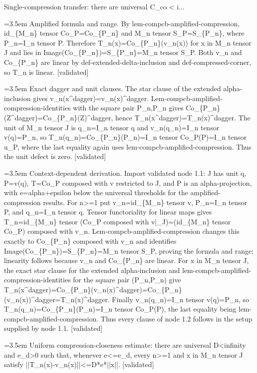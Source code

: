 \documentclass{article}
\newcommand{\step}[1]{\par\noindent\hangindent=3.5em\hangafter=1%
  \makebox[3.5em][l]{\textbf{#1.}}}
\newcommand{\steptag}[1]{\hfill{\small\textsf{[#1]}}}
\begin{document}
\begin{proofbox}{Single-compression transfer: there are universal C\_co < i...}
\step{1.2.1} Amplified formula and range. By lem-compcb-amplified-compression, id\_\{M\_n\} tensor Co\_P=Co\_\{P\_n\} and M\_n tensor S\_P=S\_\{P\_n\}, where P\_n=I\_n tensor P. Therefore T\_n(x)=Co\_\{P\_n\}(v\_n(x)) for x in M\_n tensor J and lies in Image(Co\_\{P\_n\})=S\_\{P\_n\}=M\_n tensor S\_P. Both v\_n and Co\_\{P\_n\} are linear by def-extended-delta-inclusion and def-compressed-corner, so T\_n is linear. \steptag{validated} \\[4pt]
\step{1.2.2} Exact dagger and unit clauses. The star clause of the extended alpha-inclusion gives v\_n(x\textasciicircum{}dagger)=v\_n(x)\textasciicircum{}dagger. Lem-compcb-amplified-compression-identities with the square pair P\_n,P\_n gives Co\_\{P\_n\}(Z\textasciicircum{}dagger)=Co\_\{P\_n\}(Z)\textasciicircum{}dagger, hence T\_n(x\textasciicircum{}dagger)=T\_n(x)\textasciicircum{}dagger. The unit of M\_n tensor J is q\_n=I\_n tensor q and v\_n(q\_n)=I\_n tensor v(q)=P\_n, so T\_n(q\_n)=Co\_\{P\_n\}(P\_n)=I\_n tensor Co\_P(P)=I\_n tensor u\_P, where the last equality again uses lem-compcb-amplified-compression. Thus the unit defect is zero. \steptag{validated} \\[4pt]
\step{1.2.3} Context-dependent derivation. Import validated node 1.1: J has unit q, P=v(q), T=Co\_P composed with v restricted to J, and P is an alpha-projection, with e=alpha+epsilon below the universal thresholds for the amplified-compression results. For n>=1 put v\_n=id\_\{M\_n\} tensor v, P\_n=I\_n tensor P, and q\_n=I\_n tensor q. Tensor functoriality for linear maps gives T\_n=id\_\{M\_n\} tensor (Co\_P composed with v|\_J)=(id\_\{M\_n\} tensor Co\_P) composed with v\_n. Lem-compcb-amplified-compression changes this exactly to Co\_\{P\_n\} composed with v\_n and identifies Image(Co\_\{P\_n\})=S\_\{P\_n\}=M\_n tensor S\_P, proving the formula and range; linearity follows because v\_n and Co\_\{P\_n\} are linear. For x in M\_n tensor J, the exact star clause for the extended alpha-inclusion and lem-compcb-amplified-compression-identities for the square pair (P\_n,P\_n) give T\_n(x\textasciicircum{}dagger)=Co\_\{P\_n\}(v\_n(x)\textasciicircum{}dagger)=Co\_\{P\_n\}(v\_n(x))\textasciicircum{}dagger=T\_n(x)\textasciicircum{}dagger. Finally v\_n(q\_n)=I\_n tensor v(q)=P\_n, so T\_n(q\_n)=Co\_\{P\_n\}(P\_n)=I\_n tensor Co\_P(P), the last equality being lem-compcb-amplified-compression. Thus every clause of node 1.2 follows in the setup supplied by node 1.1. \steptag{validated} \\[4pt]
\step{1.3} Uniform compression-closeness estimate: there are universal D<infinity and e\_d>0 such that, whenever e<=e\_d, every n>=1 and x in M\_n tensor J satisfy ||T\_n(x)-v\_n(x)||<=D*e*||x||. \steptag{validated} \\[6pt]

\end{proofbox}
\end{document}

